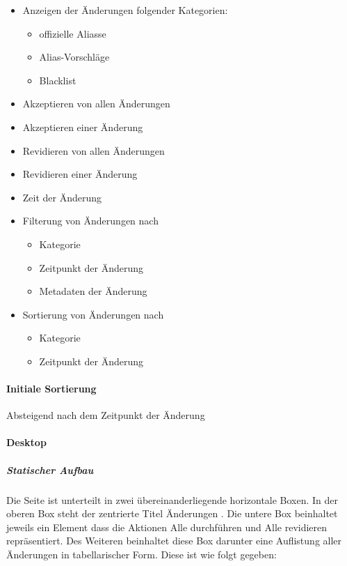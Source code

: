 \begin{itemize}
    \item Anzeigen der Änderungen folgender Kategorien: \begin{itemize}
        \item offizielle Aliasse
        \item Alias-Vorschläge
        \item Blacklist
    \end{itemize}
    \item Akzeptieren von allen Änderungen
    \item Akzeptieren einer Änderung
    \item Revidieren von allen Änderungen
    \item Revidieren einer Änderung
    \item Zeit der Änderung
    \item Filterung von Änderungen nach 
    \begin{itemize}
        \item Kategorie
        \item Zeitpunkt der Änderung
        \item Metadaten der Änderung
    \end{itemize}
    \item Sortierung von Änderungen nach 
    \begin{itemize}
        \item Kategorie
        \item Zeitpunkt der Änderung
    \end{itemize}
\end{itemize}

\paragraph*{Initiale Sortierung}
Absteigend nach dem Zeitpunkt der Änderung

\paragraph*{Desktop}
\subparagraph*{Statischer Aufbau}
Die Seite ist unterteilt in zwei übereinanderliegende horizontale Boxen.
In der oberen Box steht der zentrierte Titel \dq Änderungen \dq.
Die untere Box beinhaltet jeweils ein Element dass die Aktionen \dq Alle durchführen\dq{} und \dq Alle revidieren\dq{} repräsentiert.
Des Weiteren beinhaltet diese Box darunter eine Auflistung aller Änderungen in tabellarischer Form. Diese ist wie folgt gegeben:

